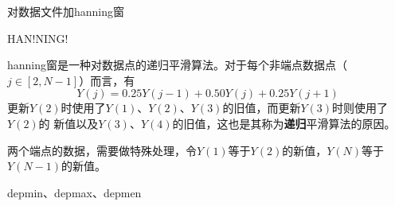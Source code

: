 \label{cmd:hanning}

对数据文件加hanning窗

\begin{SACSTX}
HAN!NING!
\end{SACSTX}

hanning窗是一种对数据点的递归平滑算法。对于每个非端点数据点（$j\in[2,N-1]$）而言，有
\[
    Y(j)=0.25Y(j-1)+0.50Y(j)+0.25Y(j+1)
\]
更新$Y(2)$时使用了$Y(1)$、$Y(2)$、$Y(3)$的旧值，而更新$Y(3)$时则使用了$Y(2)$的
新值以及$Y(3)$、$Y(4)$的旧值，这也是其称为\textbf{递归}平滑算法的原因。

两个端点的数据，需要做特殊处理，令$Y(1)$等于$Y(2)$的新值，$Y(N)$等于$Y(N-1)$的新值。

depmin、depmax、depmen

